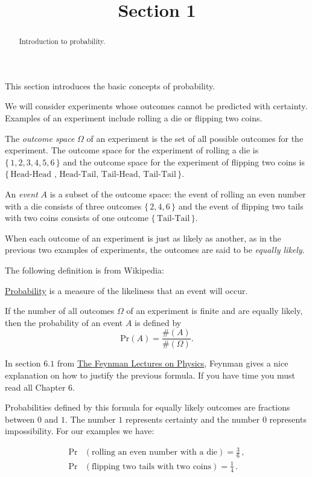 \documentclass{ximera}
\title{Section 1}
\begin{document}
\begin{abstract}
Introduction to probability.
\end{abstract}
\maketitle

This section introduces the basic concepts of probability. \vspace{.25cm}

We will consider experiments whose outcomes cannot be predicted with certainty. Examples of an experiment include rolling a die or flipping two coins.

The {\it outcome space} $\Omega$ of an experiment is the set of all possible outcomes for the experiment. The outcome space for the experiment of rolling a die is $\{\,1,2,3,4,5,6\,\}$ and the outcome space for the experiment of flipping two coins is $\{\, \text{Head-Head , Head-Tail, Tail-Head, Tail-Tail} \,\}$.

An {\it event} $A$ is a subset of the outcome space: the event of rolling an even number with a die consists of three outcomes $\{\,2,4,6\,\}$ and the event of flipping two tails with two coins consists of one outcome $\{\, \text{Tail-Tail} \,\}$. 

When each outcome of an experiment is just as likely as another, as in the previous two examples of experiments, the outcomes are said to be {\it equally likely}. \vspace{.25cm}

The following definition is from Wikipedia: 

\href{http://en.wikipedia.org/wiki/Probability}{Probability} is a measure of the likeliness that an event will occur. \vspace{.25cm}

If the number of all outcomes $\Omega$ of an experiment is finite and are equally likely, then the probability of an event $A$ is defined by
\[
\text{Pr}(A) = \frac{ \#(A) }{ \#(\Omega)}.
\]

In section $6.1$ from \href{ http://www.feynmanlectures.caltech.edu/I_06.html#Ch6-S1}{The Feynman Lectures on Physics}, Feynman gives a nice explanation on how to justify the previous formula. If you have time you must read all Chapter $6$. \vspace{.25cm}

Probabilities defined by this formula for equally likely outcomes are fractions between $0$ and $1$. The number $1$ represents certainty and the number $0$ represents impossibility. 
For our examples we have:

\begin{align*}
\text{Pr}&( \text{rolling an even number with a die} ) = \frac{3}{6}\,,  \\
\text{Pr}&( \text{flipping two tails with two coins} ) = \frac{1}{4}\,.
\end{align*}
\end{document}
